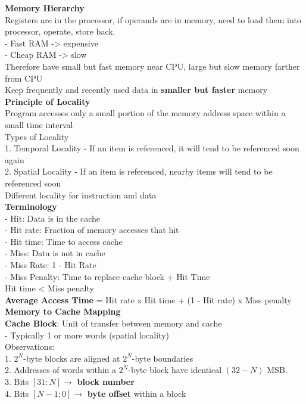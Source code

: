 \documentclass[10pt, a4paper]{article}
\newcommand{\highlight}[1]{{\color{red}\textbf{#1}}}
\newcommand{\red}[1]{{\color{red}#1}}
\newcommand{\green}[1]{{\color{ForestGreen}#1}}
\begin{document}
\begin{multicols*}{3}
		\textbf{Memory Hierarchy}\\
		Registers are in the processor, if operands are in memory, need to load them into processor, operate, store back.\\
		- Fast RAM -> expensive\\
		- Cheap RAM -> slow\\
		Therefore have small but fast memory near CPU, large but slow memory farther from CPU\\
		Keep frequently and recently used data in \highlight{smaller but faster} memory\\

		\textbf{Principle of Locality}\\
		Program accesses only a small portion of the memory address space within a small time interval\\
		Types of Locality\\
		1. Temporal Locality - If an item is referenced, it will tend to be referenced soon again\\
		2. Spatial Locality - If an item is referenced, nearby items will tend to be referenced soon\\
		Different locality for instruction and data\\

		\textbf{Terminology}\\
		- \green{Hit}: Data is in the cache\\
		- \green{Hit rate}: Fraction of memory accesses that hit\\
		- \green{Hit time}: Time to access cache\\
		- \red{Miss}: Data is not in cache\\
		- \red{Miss Rate}: 1 - \green{Hit Rate}\\
		- \red{Miss Penalty}: Time to replace cache block + \green{Hit Time}\\
		Hit time < Miss penalty\\
		\highlight{Average Access Time} = Hit rate x Hit time + (1 - Hit rate) x Miss penalty\\

		\textbf{Memory to Cache Mapping}\\
		\highlight{Cache Block}: Unit of transfer between memory and cache\\
		- Typically 1 or more words (spatial locality)\\

		Observations:\\
		1. $2^{N}$-byte blocks are aligned at $2^{N}$-byte boundaries\\
		2. Addresses of words within a $2^{N}$-byte block have identical $(32-N)$ MSB.\\
		3. Bits $[31:N] \rightarrow$ \highlight{block number}\\
		4. Bits $[N-1:0] \rightarrow$ \highlight{byte offset} within a block\\


\end{multicols*}
\end{document}
